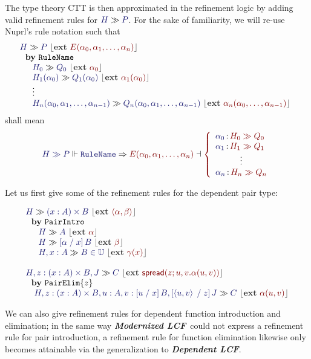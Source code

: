 \documentclass[11pt]{article}
\theoremstyle{definition}
\theoremstyle{remark}
\numberwithin{equation}{section}
\def\IModeColorName{MidnightBlue}
\def\OModeColorName{Maroon}
\newcommand\IMode[1]{{\color{\IModeColorName}{#1}}}
\newcommand\OMode[1]{{\color{\OModeColorName}{#1}}}
\newcommand\OSG[2]{\IMode{#1}\,{\color{Black}:}\,\OMode{#2}}
\newcommand\Refine[4]{\IMode{#1}\Vdash\IMode{#2}\Rightarrow\OMode{#4}\dashv\OMode{#3}}
\newcommand\MemberUnmoded[2]{#1\in #2}
\newcommand\DPairIntroRuleNullary{\mathtt{PairIntro}}
\newcommand\DPairElimRule[1]{\mathtt{PairElim}\{#1\}}
\newcommand\TyDPair[3]{(#2:#1) \times #3}
\newcommand\Tuple[1]{\left\langle#1\right\rangle}
\newcommand\Spread[4]{\mathsf{spread}(#1;#2,#3.#4)}
\newcommand\TyUniv{\mathbb{U}}
\newcommand\Subst[3]{\left[#1\;/\;#2\right]#3}
\newcommand\ModLCF{\textbf{\emph{Modernized LCF}}}
\newcommand\DepLCF{\textbf{\emph{Dependent LCF}}}
\newcommand\Seq[2]{#1 \gg #2}
\newcommand\Ext[1]{{\color{dark-gray}\left\lfloor\mathbf{ext}\ \OMode{#1}\right\rfloor}}
\newcommand\SeqExt[3]{
  \Seq{\IMode{#1}}{\IMode{#2}}\ \Ext{#3}
}
\newcommand\NuprlRule[3]{%
  \begin{array}{l}%
    #2\\
    \ \ \mathbf{by}\ #1\\
    \quad #3
  \end{array}%
}
\begin{document}
The type theory CTT is then approximated in the refinement logic by adding
valid refinement rules for $\Seq{\IMode{H}}{\IMode{P}}$. For the sake of
familiarity, we will re-use Nuprl's rule notation such that
\[
  \NuprlRule{\texttt{RuleName}}{
    \SeqExt{H}{P}{E(\alpha_0,\alpha_1,\dots,\alpha_n)}
  }{
    \begin{array}{l}
      \SeqExt{H_0}{Q_0}{\alpha_0}\\
      \SeqExt{H_1(\alpha_0)}{Q_1(\alpha_0)}{\alpha_1(\alpha_0)}\\
      \vdots\\
      \SeqExt{H_n(\alpha_0,\alpha_1,\dots,\alpha_{n-1})}{Q_n(\alpha_0,\alpha_1,\dots,\alpha_{n-1})}{\alpha_n(\alpha_0,\dots,\alpha_{n-1})}
    \end{array}
  }
\]
shall mean
\[
  \Refine{
    \Seq{H}{P}
  }{
    \mathtt{RuleName}
  }{
    \left\{\begin{array}{l}
      \OSG{\alpha_0}{\Seq{H_0}{Q_0}}\\
      \OSG{\alpha_1}{\Seq{H_1}{Q_1}}\\
      \multicolumn{1}{c}{\color{Black}\vdots}\\
      \OSG{\alpha_n}{\Seq{H_n}{Q_n}}\\
    \end{array}\right.
  }{
    E(\alpha_0,\alpha_1,\dots,\alpha_n)
  }
\]


Let us first give some of the refinement rules for the dependent pair type:

\[
  \begin{array}{l}
    \NuprlRule{\DPairIntroRuleNullary}{
      \SeqExt{H}{\TyDPair{A}{x}{B}}{\Tuple{\alpha,\beta}}
    }{
      \begin{array}{l}
        \SeqExt{H}{A}{\alpha}\\
        \SeqExt{H}{\Subst{\alpha}{x}{B}}{\beta}\\
        \SeqExt{H,x:A}{\MemberUnmoded{B}{\TyUniv}}{\gamma(x)}
      \end{array}
    }\\\\
    \NuprlRule{\DPairElimRule{z}}{
      \SeqExt{H,z:\TyDPair{A}{x}{B},J}{C}{
        \Spread{z}{u}{v}{\alpha(u,v)}
      }
    }{
      \SeqExt{H,z:\TyDPair{A}{x}{B},u:A,v:\Subst{u}{x}{B},\Subst{\Tuple{u,v}}{z}{J}}{C}{
        \alpha(u,v)
      }
    }
  \end{array}
\]

We can also give refinement rules for dependent function introduction and
elimination; in the same way \ModLCF\ could not express a refinement rule for
pair introduction, a refinement rule for function elimination likewise only
becomes attainable via the generalization to \DepLCF.
\end{document}

